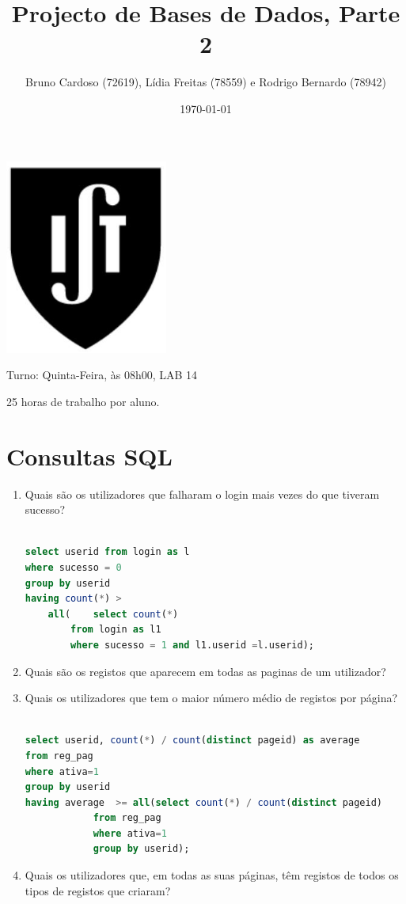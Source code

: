 \documentclass[11pt,a4paper]{article}
\title{\textbf{Projecto de Bases de Dados, Parte 2}}
\author{Bruno Cardoso (72619), Lídia Freitas (78559) e Rodrigo Bernardo (78942)}
\affil{Instituto Superior Técnico}
\begin{document}
\date {\today}

\maketitle

\centerline{\includegraphics[width=0.4\textwidth]{ist-simbolo.jpg}}

\begin{description}[noitemsep]
	\item {}
	\item Turno: Quinta-Feira, às 08h00, LAB 14
	\item 25 horas de trabalho por aluno.
\end{description}

\newpage

\tableofcontents
\newpage

\section{Consultas SQL}

\begin{enumerate}[label=(\alph*)]
	\item Quais são os utilizadores que falharam o login mais vezes do que tiveram sucesso?
		\begin{lstlisting}[language=SQL]
		
select userid from login as l 
where sucesso = 0 
group by userid 
having count(*) > 
	all(	select count(*) 
		from login as l1 
		where sucesso = 1 and l1.userid =l.userid);
		\end{lstlisting}

	\item Quais são os registos que aparecem em todas as paginas de um utilizador?
	\item Quais os utilizadores que tem o maior número médio de registos por página?
		\begin{lstlisting}[language=SQL]
		
select userid, count(*) / count(distinct pageid) as average
from reg_pag  
where ativa=1  
group by userid  
having average  >= all(select count(*) / count(distinct pageid) 
			from reg_pag 
			where ativa=1 
			group by userid);
		\end{lstlisting}
	
	\item Quais os utilizadores que, em todas as suas páginas, têm registos de todos os tipos de registos que criaram?
\end{enumerate}
\end{document}
